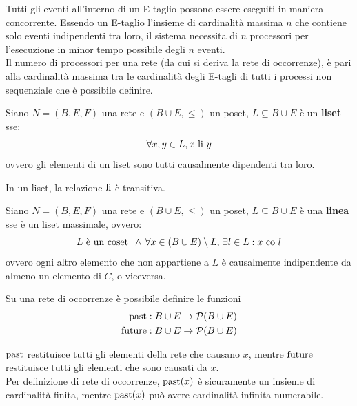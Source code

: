 \begin{rem}
    Tutti gli eventi all'interno di un E-taglio possono essere eseguiti in maniera concorrente. Essendo un E-taglio l'insieme di cardinalità massima $n$ che contiene solo eventi indipendenti tra loro, il sistema necessita di $n$ processori per l'esecuzione in minor tempo possibile degli $n$ eventi.\\
    Il numero di processori per una rete (da cui si deriva la rete di occorrenze), è pari alla cardinalità massima tra le cardinalità degli E-tagli di tutti i processi non sequenziale che è possibile definire.
\end{rem}

\begin{defn}
    Siano $N = (B, E, F)$ una rete e $(B \cup E, \le)$ un poset, $L \subseteq B \cup E$ è un \textbf{liset} sse:
    \[
        \forall x, y \in L, x \textnormal{ li } y
    \]
    ovvero gli elementi di un liset sono tutti causalmente dipendenti tra loro.
\end{defn}

\begin{rem}
    In un liset, la relazione $\textnormal{li}$ è transitiva.
\end{rem}

\begin{defn}
    Siano $N = (B, E, F)$ una rete e $(B \cup E, \le)$ un poset, $L \subseteq B \cup E$ è una \textbf{linea} sse è un liset massimale, ovvero:
    \[
        L \textnormal{ è un coset } \, \land \, \forall x \in (B \cup E) \setminus L, \, \exists l \in L : x \textnormal{ co } l
    \]
    ovvero ogni altro elemento che non appartiene a $L$ è causalmente indipendente da almeno un elemento di $C$, o viceversa.
\end{defn}



Su una rete di occorrenze è possibile definire le funzioni
\begin{align*}
    \textnormal{past}: B \cup E &\rightarrow \mathcal{P}(B \cup E)\\
    \textnormal{future}: B \cup E &\rightarrow \mathcal{P}(B \cup E)
\end{align*}

$\textnormal{past}$ restituisce tutti gli elementi della rete che causano $x$, mentre $\textnormal{future}$ restituisce tutti gli elementi che sono causati da $x$.\\
Per definizione di rete di occorrenze, $\textnormal{past}(x)$ è sicuramente un insieme di cardinalità finita, mentre $\textnormal{past}(x)$ può avere cardinalità infinita numerabile.

